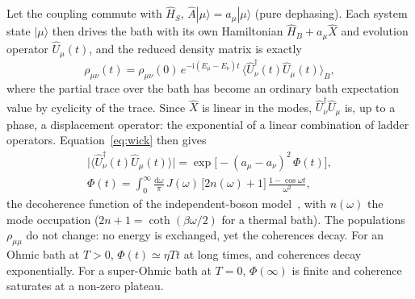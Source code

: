 \documentclass[10pt,a4paper]{article}
\newcommand{\dd}{\mathrm{d}}
\newcommand{\ii}{\mathrm{i}}
\begin{document}
Let the coupling commute with $ \hat H_S $, $ \hat A |\mu\rangle = a_\mu |\mu\rangle $ (pure dephasing).
Each system state $ |\mu\rangle $ then drives the bath with its own Hamiltonian $ \hat H_B + a_\mu \hat X $ and evolution operator $ \hat U_\mu(t) $, and the reduced density matrix is exactly
\begin{equation}
  \rho_{\mu\nu}(t) = \rho_{\mu\nu}(0) \, e^{-\ii(E_\mu - E_\nu)t} \, \big\langle \hat U_\nu^\dagger(t) \hat U_\mu(t) \big\rangle_B ,
  \label{eq:dephasing}
\end{equation}
where the partial trace over the bath has become an ordinary bath expectation value by cyclicity of the trace.
Since $ \hat X $ is linear in the modes, $ \hat U_\nu^\dagger \hat U_\mu $ is, up to a phase, a displacement operator: the exponential of a linear combination of ladder operators.
Equation~\eqref{eq:wick} then gives
\begin{equation}
  \begin{gathered}
  \big| \big\langle \hat U_\nu^\dagger(t) \hat U_\mu(t) \big\rangle \big|
  = \exp\big[ -(a_\mu - a_\nu)^2 \, \Phi(t) \big] ,
  \\
  \Phi(t) = \int_0^\infty \frac{\dd\omega}{\pi} \, J(\omega) \, \big[ 2n(\omega) + 1 \big] \, \frac{1 - \cos\omega t}{\omega^2} ,
  \end{gathered}
  \label{eq:decoherence}
\end{equation}
the decoherence function of the independent-boson model~\cite{Mahan2000,Breuer2002}, with $ n(\omega) $ the mode occupation ($ 2n+1 = \coth(\beta\omega/2) $ for a thermal bath).
The populations $ \rho_{\mu\mu} $ do not change: no energy is exchanged, yet the coherences decay.
For an Ohmic bath at $ T > 0 $, $ \Phi(t) \simeq \eta T t $ at long times, and coherences decay exponentially.
For a super-Ohmic bath at $ T = 0 $, $ \Phi(\infty) $ is finite and coherence saturates at a non-zero plateau.
\end{document}

